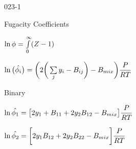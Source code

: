 \begin{mitframe}{023-1}
\begin{listone}
\begin{listtwo}
\begin{listthree}
   	\end{listthree}
		    
    \end{listtwo}    
    
    \item Fugacity Coefficients

    \begin{listtwo}
		
       \item $\ln\eleccoeff= \int\limits_{0}^{\infty}(\compress-1)$
        
        
        \item $\ln\big(\hat{\fhmolefrac{i}}\big)=\bigg(2\bigg(\sum\limits_{j} y_{i}-\virialcoeff{ij}\bigg)-\virialcoeff{\mixfunc}\bigg)\dfrac{\p}{\gasconst\Temp}$
        
        \item Binary
        
        \begin{listthree}
		
        	\item  $\ln\hat{\eleccoeff_{1}}=\big[2y_{1}+\virialcoeff{11}+2y_{2}\virialcoeff{12}-\virialcoeff{\mixfunc}\big]\dfrac{\p}{\gasconst\Temp}$
               
          \item $\ln\hat{\eleccoeff_{2}}= \bigg[2y_{1}\virialcoeff{12}+2y_{2}\virialcoeff{22}-\virialcoeff{\mixfunc}\bigg]\dfrac{\p}{\gasconst\Temp}$
          
	
    	\end{listthree}
	
    \end{listtwo}
                   
\end{listone}			

\end{mitframe}